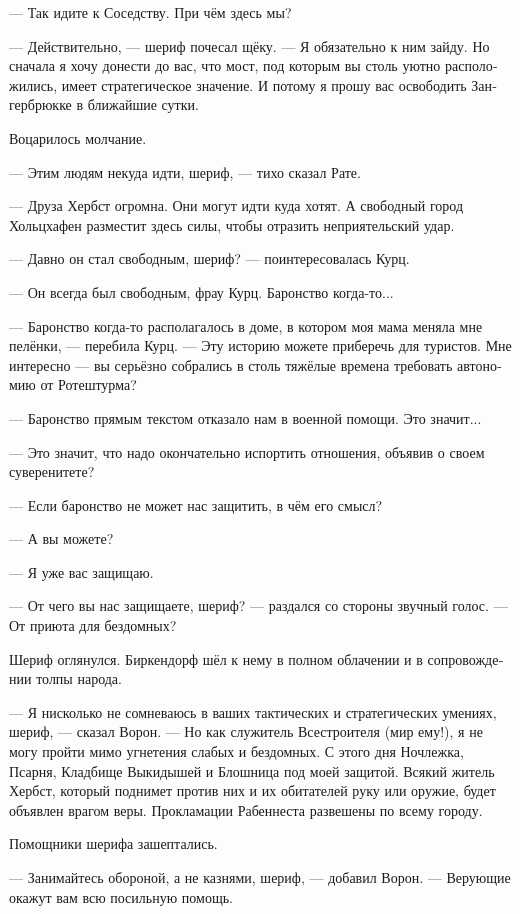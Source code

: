 \documentclass[a4paper,12pt,fleqn]{book}\usepackage{polyglossia}\setdefaultlanguage[babelshorthands=true]{russian}\setotherlanguage{english}\defaultfontfeatures{Ligatures=TeX,Mapping=tex-text}\usepackage{xcolor}\newcommand{\ml}[3]{#2}
\begin{document}
--- Так идите к Соседству.
При чём здесь мы?

--- Действительно, --- шериф почесал щёку.
--- Я обязательно к ним зайду.
Но сначала я хочу донести до вас, что мост, под которым вы столь уютно расположились, имеет стратегическое значение.
И потому я прошу вас освободить Зангербрюкке в ближайшие сутки.

Воцарилось молчание.

--- Этим людям некуда идти, шериф, --- тихо сказал Рате.

--- Друза Хербст огромна.
Они могут идти куда хотят.
А свободный город Хольцхафен разместит здесь силы, чтобы отразить неприятельский удар.

--- Давно он стал свободным, шериф? --- поинтересовалась Курц.

--- Он всегда был свободным, фрау Курц.
Баронство когда-то...

--- Баронство когда-то располагалось в доме, в котором моя мама меняла мне пелёнки, --- перебила Курц.
--- Эту историю можете приберечь для туристов.
Мне интересно --- вы серьёзно собрались в столь тяжёлые времена требовать автономию от Ротештурма?

--- Баронство прямым текстом отказало нам в военной помощи.
Это значит...

--- Это значит, что надо окончательно испортить отношения, объявив о своем суверенитете?

--- Если баронство не может нас защитить, в чём его смысл?

--- А вы можете?

--- Я уже вас защищаю.

--- От чего вы нас защищаете, шериф? --- раздался со стороны звучный голос.
--- От приюта для бездомных?

Шериф оглянулся.
Биркендорф шёл к нему в полном облачении и в сопровождении толпы народа.

--- Я нисколько не сомневаюсь в ваших тактических и стратегических умениях, шериф, --- сказал Ворон.
--- Но как служитель Всестроителя (мир ему!), я не могу пройти мимо угнетения слабых и бездомных.
С этого дня Ночлежка, Псарня, Кладбище Выкидышей и Блошница под моей защитой.
Всякий житель Хербст, который поднимет против них и их обитателей руку или оружие, будет объявлен врагом веры.
Прокламации Рабеннеста развешены по всему городу.

Помощники шерифа зашептались.

--- Занимайтесь обороной, а не казнями, шериф, --- добавил Ворон.
--- Верующие окажут вам всю посильную помощь.
\end{document}
